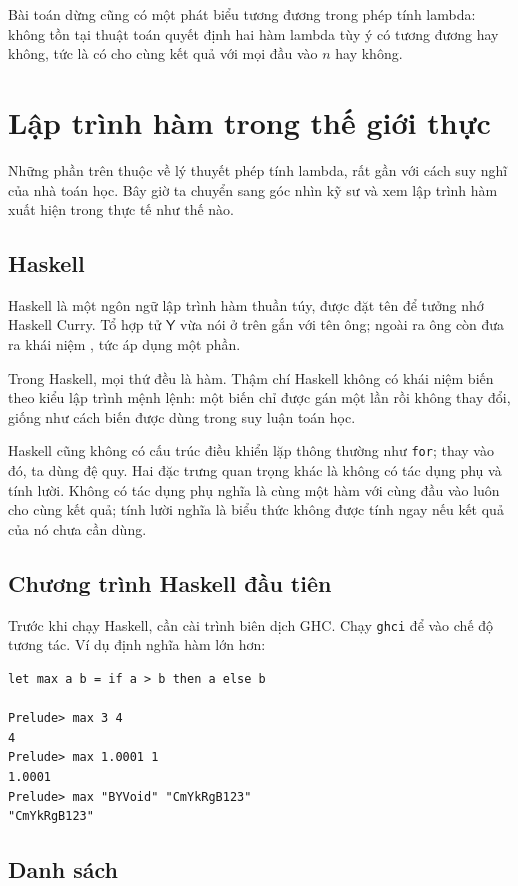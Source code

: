 \documentclass[11pt]{article}
\newcommand{\Ycomb}{\mathsf{Y}}
\begin{document}
Bài toán dừng cũng có một phát biểu tương đương trong phép tính lambda:
không tồn tại thuật toán quyết định hai hàm lambda tùy ý có tương đương hay
không, tức là có cho cùng kết quả với mọi đầu vào \(n\) hay không.

\section{Lập trình hàm trong thế giới thực}

Những phần trên thuộc về lý thuyết phép tính lambda, rất gần với cách suy
nghĩ của nhà toán học. Bây giờ ta chuyển sang góc nhìn kỹ sư và xem lập trình
hàm xuất hiện trong thực tế như thế nào.

\subsection{Haskell}

Haskell là một ngôn ngữ lập trình hàm thuần túy, được đặt tên để tưởng nhớ
Haskell Curry. Tổ hợp tử \(\Ycomb\) vừa nói ở trên gắn với tên ông; ngoài ra
ông còn đưa ra khái niệm , tức áp dụng một phần.

Trong Haskell, mọi thứ đều là hàm. Thậm chí Haskell không có khái niệm biến
theo kiểu lập trình mệnh lệnh: một biến chỉ được gán một lần rồi không thay
đổi, giống như cách biến được dùng trong suy luận toán học.

Haskell cũng không có cấu trúc điều khiển lặp thông thường như \texttt{for};
thay vào đó, ta dùng đệ quy. Hai đặc trưng quan trọng khác là không có tác
dụng phụ và tính lười. Không có tác dụng phụ nghĩa là cùng một hàm với cùng
đầu vào luôn cho cùng kết quả; tính lười nghĩa là biểu thức không được tính
ngay nếu kết quả của nó chưa cần dùng.

\subsection{Chương trình Haskell đầu tiên}

Trước khi chạy Haskell, cần cài trình biên dịch GHC. Chạy \texttt{ghci} để vào
chế độ tương tác. Ví dụ định nghĩa hàm lớn hơn:
\begin{verbatim}
let max a b = if a > b then a else b

Prelude> max 3 4
4
Prelude> max 1.0001 1
1.0001
Prelude> max "BYVoid" "CmYkRgB123"
"CmYkRgB123"
\end{verbatim}

\subsection{Danh sách}
\end{document}
